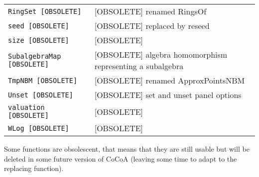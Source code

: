 \documentclass[a4paper]{mybook}
\begin{document}
\begin{center}
\begin{longtable}{ll}
{\verb~RingSet [OBSOLETE]~} &
      [OBSOLETE] renamed RingsOf\\
   
{\verb~seed [OBSOLETE]~} &
      [OBSOLETE] replaced by reseed\\
   
{\verb~size [OBSOLETE]~} &
      [OBSOLETE]\\
   
{\verb~SubalgebraMap [OBSOLETE]~} &
      [OBSOLETE] algebra homomorphism representing a subalgebra\\
   
{\verb~TmpNBM [OBSOLETE]~} &
      [OBSOLETE] renamed ApproxPointsNBM\\
   
{\verb~Unset [OBSOLETE]~} &
      [OBSOLETE] set and unset panel options\\
   
{\verb~valuation [OBSOLETE]~} &
      [OBSOLETE]\\
   
{\verb~WLog [OBSOLETE]~} &
      [OBSOLETE]\\
   
\end{longtable}
\end{center}
\noindent


Some functions are obsolescent, that means that they are still usable
but will be deleted in some future version of CoCoA (leaving some time
to adapt to the replacing function).
\end{document}
